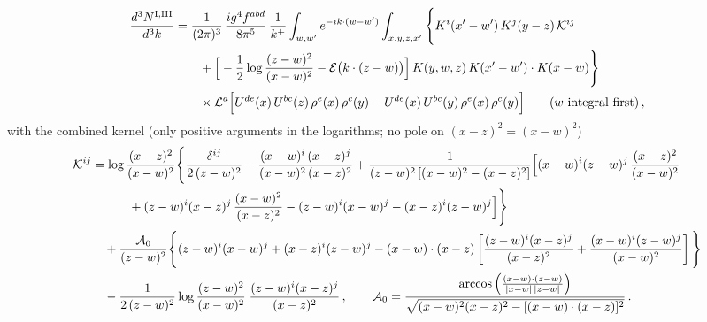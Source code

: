 \documentclass[9pt]{article}
\numberwithin{equation}{section}
\begin{document}
{\color{red}
\begin{align}
\frac{d^{3}N^{\rm I,III}}{d^{3}k}&=\frac{1}{(2\pi)^{3}}\,\frac{ig^{4}f^{abd}}{8\pi^{5}}\,\frac{1}{k^{+}}\int_{w,w'}e^{-ik\cdot(w-w')}\int_{x,y,z,x'}\Bigg\{K^{i}(x'-w')\,K^{j}(y-z)\,\mathcal{K}^{ij}\notag\\
&\qquad+\Big[-\frac12\log\frac{(z-w)^{2}}{(x-w)^{2}}-\mathcal{E}\big(k\cdot(z-w)\big)\Big]\,K(y,w,z)\,K(x'-w')\cdot K(x-w)\Bigg\}\notag\\&\qquad\times\mathcal{L}^{a}\Big[U^{de}(x)\,U^{bc}(z)\,\rho^{e}(x)\,\rho^{c}(y)-U^{de}(x)\,U^{bc}(y)\,\rho^{e}(x)\,\rho^{c}(y)\Big]\qquad(w\text{ integral first})\,,\label{eq:fx-GIIII}
\end{align}
with the combined kernel (only positive arguments in the logarithms; no pole on $(x-z)^{2}=(x-w)^{2}$)
\begin{align}
\mathcal{K}^{ij}&=\log\frac{(x-z)^{2}}{(x-w)^{2}}\Bigg\{\frac{\delta^{ij}}{2\,(z-w)^{2}}-\frac{(x-w)^{i}\,(x-z)^{j}}{(x-w)^{2}\,(x-z)^{2}}
+\frac{1}{(z-w)^{2}\left[(x-w)^{2}-(x-z)^{2}\right]}\Big[(x-w)^{i}(z-w)^{j}\,\frac{(x-z)^{2}}{(x-w)^{2}}\notag\\
&\qquad\quad+(z-w)^{i}(x-z)^{j}\,\frac{(x-w)^{2}}{(x-z)^{2}}-(z-w)^{i}(x-w)^{j}-(x-z)^{i}(z-w)^{j}\Big]\Bigg\}\notag\\
&\quad+\frac{\mathcal{A}_{0}}{(z-w)^{2}}\Bigg\{(z-w)^{i}(x-w)^{j}+(x-z)^{i}(z-w)^{j}-(x-w)\cdot(x-z)\left[\frac{(z-w)^{i}(x-z)^{j}}{(x-z)^{2}}+\frac{(x-w)^{i}(z-w)^{j}}{(x-w)^{2}}\right]\Bigg\}\notag\\
&\quad-\frac{1}{2\,(z-w)^{2}}\log\frac{(z-w)^{2}}{(x-w)^{2}}\;\frac{(z-w)^{i}(x-z)^{j}}{(x-z)^{2}}\,,\qquad
\mathcal{A}_{0}=\frac{\arccos\Big(\frac{(x-w)\cdot(z-w)}{|x-w|\,|z-w|}\Big)}{\sqrt{(x-w)^{2}(x-z)^{2}-[(x-w)\cdot(x-z)]^{2}}}\,.\label{eq:fx-Kij}
\end{align}
}
\end{document}
